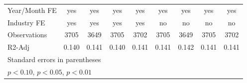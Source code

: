 {\begin{tabular}{l*{8}{c}}
\hline
Year/Month FE       &         yes         &         yes         &         yes         &         yes         &         yes         &         yes         &         yes         &         yes         \\
Industry FE         &         yes         &         yes         &         yes         &         yes         &          no         &          no         &          no         &          no         \\
Observations        &        3705         &        3649         &        3705         &        3702         &        3705         &        3649         &        3705         &        3702         \\
R2-Adj              &       0.140         &       0.141         &       0.140         &       0.141         &       0.141         &       0.142         &       0.141         &       0.141         \\
\hline\hline
\multicolumn{9}{l}{\footnotesize Standard errors in parentheses}\\
\multicolumn{9}{l}{\footnotesize \sym{*} \(p<0.10\), \sym{**} \(p<0.05\), \sym{***} \(p<0.01\)}\\
\end{tabular}
}

